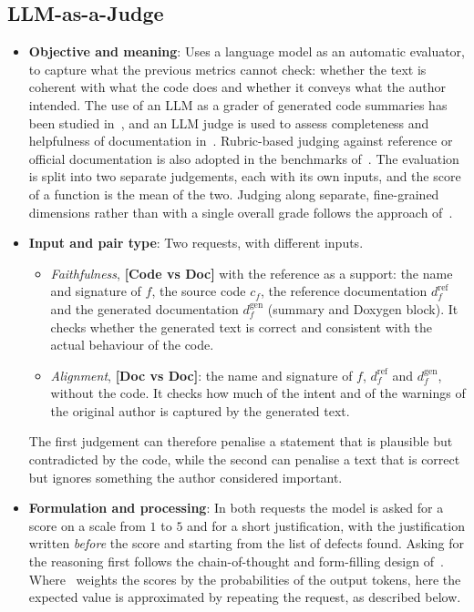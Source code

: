 \subsection{LLM-as-a-Judge}
\label{sec:m-judge}
\begin{itemize}[leftmargin=*, label=\textbullet]
	\item \textbf{Objective and meaning}: Uses a language model as an automatic evaluator, to capture
	what the previous metrics cannot check: whether the text is coherent with what the code does and
	whether it conveys what the author intended. The use of an LLM as a grader of generated code
	summaries has been studied in~\cite{wu_can_2024}, and an LLM judge is used to assess completeness
	and helpfulness of documentation in~\cite{yang_docagent_2025}. Rubric-based judging against
	reference or official documentation is also adopted in the benchmarks
	of~\cite{hoang_codewiki_2026, patel_assetopsbench_2026}. The evaluation is split into two separate
	judgements, each with its own inputs, and the score of a function is the mean of the two. Judging
	along separate, fine-grained dimensions rather than with a single overall grade follows the
	approach of~\cite{bai_mt-bench-101_2024}.

	\item \textbf{Input and pair type}: Two requests, with different inputs.
	\begin{itemize}[leftmargin=*, label=--]
		\item \emph{Faithfulness}, \textbf{[Code vs Doc]} with the reference as a support: the name and
		signature of $f$, the source code $c_f$, the reference documentation $d_f^{\mathrm{ref}}$ and the
		generated documentation $d_f^{\mathrm{gen}}$ (summary and Doxygen block). It checks whether the
		generated text is correct and consistent with the actual behaviour of the code.
		\item \emph{Alignment}, \textbf{[Doc vs Doc]}: the name and signature of $f$, $d_f^{\mathrm{ref}}$
		and $d_f^{\mathrm{gen}}$, without the code. It checks how much of the intent and of the warnings
		of the original author is captured by the generated text.
	\end{itemize}
	The first judgement can therefore penalise a statement that is plausible but contradicted by the
	code, while the second can penalise a text that is correct but ignores something the author
	considered important.

	\item \textbf{Formulation and processing}: In both requests the model is asked for a score on a
	scale from $1$ to $5$ and for a short justification, with the justification written \emph{before}
	the score and starting from the list of defects found. Asking for the reasoning first follows the
	chain-of-thought and form-filling design of~\cite{liu_g-eval_2023}. Where~\cite{liu_g-eval_2023}
	weights the scores by the probabilities of the output tokens, here the expected value is
	approximated by repeating the request, as described below.


\end{itemize}
